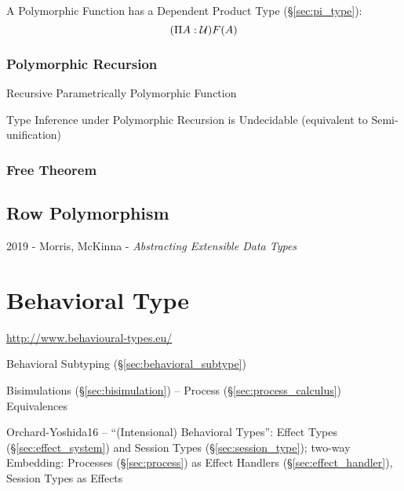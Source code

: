 A Polymorphic Function has a Dependent Product Type
(\S\ref{sec:pi_type}):
\[
  (\Pi A:\mathcal{U}) F(A)
\]



\subsubsection{Polymorphic Recursion}\label{sec:polymorphic_recursion}

Recursive Parametrically Polymorphic Function

Type Inference under Polymorphic Recursion is Undecidable (equivalent
to Semi-unification) %



\subsubsection{Free Theorem}\label{sec:free_theorem}



\subsection{Row Polymorphism}\label{sec:row_polymorphism}

2019 - Morris, McKinna - \emph{Abstracting Extensible Data Types}



\section{Behavioral Type}\label{sec:behavioral_type}

\url{http://www.behavioural-types.eu/}

\fist Behavioral Subtyping (\S\ref{sec:behavioral_subtype})

\fist Bisimulations (\S\ref{sec:bisimulation}) -- Process
(\S\ref{sec:process_calculus}) Equivalences

Orchard-Yoshida16 \cite{orchard-yoshida16} -- ``(Intensional)
Behavioral Types'': Effect Types (\S\ref{sec:effect_system}) and
Session Types (\S\ref{sec:session_type}); two-way Embedding: Processes
(\S\ref{sec:process}) as Effect Handlers (\S\ref{sec:effect_handler}),
Session Types as Effects


